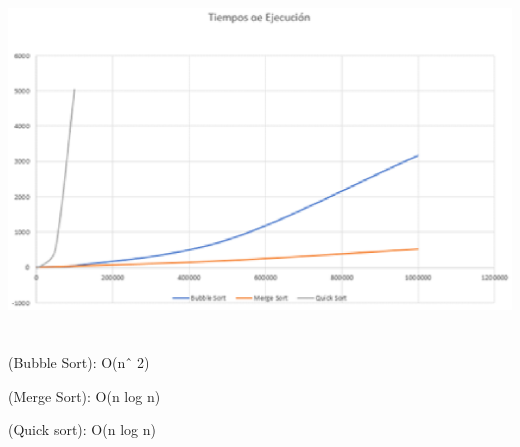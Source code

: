 \documentclass{article} %
\begin{document}
\noindent 

\noindent \includegraphics*[width=6.13in, height=3.65in, keepaspectratio=false]{image2}

\noindent 

\noindent (Bubble  Sort):  O(nˆ 2)

\noindent (Merge Sort):  O(n log n)

\noindent (Quick sort): O(n log n)
\end{document}
